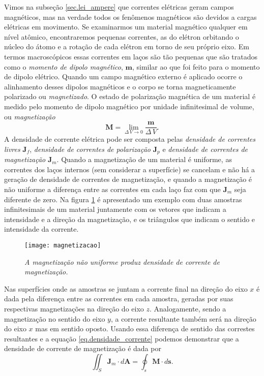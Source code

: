Vimos na subseç\~ao \ref{sec.lei_ampere} que correntes el\'etricas geram campos magn\'eticos, mas na verdade todos os fen\^omenos magn\'eticos são devidos a cargas el\'etricas em movimento. Se examinarmos um material magn\'etico qualquer em n\'ivel at\^omico, encontraremos pequenas correntes, as do el\'etron orbitando o n\'ucleo do \'atomo e a rota\c{c}\~ao de cada el\'etron em torno de seu pr\'oprio eixo. Em termos macrosc\'opicos essas correntes em la\c{c}os s\~ao t\~ao pequenas que s\~ao tratados como o \textit{momento de dipolo magn\'etico}, $\mathbf{m}$, similar ao que foi feito para o momento de dipolo el\'etrico. Quando um campo magn\'etico externo \'e aplicado ocorre o alinhamento desses dipolos magn\'eticos e o corpo se torna magneticamente polarizado ou \textit{magnetizado}. O estado de polariza\c{c}\~ao magn\'etica de um material \'e medido pelo momento de dipolo magn\'etico por unidade infinitesimal de volume, ou \textit{magnetiza\c{c}\~ao}
\begin{equation*}
\mathbf{M}=\lim_{\Delta\,V\to 0}\frac{\mathbf{m}}{\Delta\,V}.
\end{equation*}   
A densidade de corrente el\'etrica pode ser composta pelas \textit{densidade de correntes livres} $\mathbf{J}_f$, \textit{densidade de correntes de polariza\c{c}\~ao} $\mathbf{J}_p$ e \textit{densidade de correntes de magnetiza\c{c}\~ao} $\mathbf{J}_m$. Quando a magnetiza\c{c}\~ao de um material \'e uniforme, as correntes dos la\c{c}os internos (sem considerar a superf\'icie) se cancelam e n\~ao h\'a a gera\c{c}\~ao de densidade de correntes de magnetiza\c{c}\~ao, e quando a magnetiza\c{c}\~ao \'e n\~ao uniforme a diferen\c{c}a entre as correntes em cada la\c{c}o faz com que $\mathbf{J}_m$ seja diferente de zero. Na figura \ref{fig.magnetizacao} \'e apresentado um exemplo com duas amostras infinitesimais de um material juntamente com os vetores que indicam a intensidade e a dire\c{c}\~ao da magnetiza\c{c}\~ao, e os tri\^angulos que indicam o sentido e intensidade da corrente.
\begin{figure}
\centering
\texttt{[image: magnetizacao]}
\caption{\textit{A magnetiza\c{c}\~ao n\~ao uniforme produz densidade de corrente de magnetiza\c{c}\~ao.}}
\label{fig.magnetizacao}
\end{figure}     
Nas superf\'icies onde as amostras se juntam a corrente final na dire\c{c}\~ao do eixo $x$ \'e dada pela diferen\c{c}a entre as correntes em cada amostra, geradas por suas respectivas magnetiza\c{c}\~oes na dire\c{c}\~ao do eixo $z$. Analogamente, sendo a magnetiza\c{c}\~ao no sentido do eixo $y$, a corrente resultante tamb\'em ser\'a na dire\c{c}\~ao do eixo $x$ mas em sentido oposto. Usando essa diferen\c{c}a de sentido das correstes resultantes e a equa\c{c}\~ao \ref{eq.densidade_corrente} podemos demonstrar que a densidade de corrente de magnetiza\c{c}\~ao \'e dada por
\begin{equation}\label{eq.magnetizacao_densi_corrente}
\iint_S\mathbf{J}_m\cdot d\mathbf{A}=\oint_s \mathbf{M}\cdot d\mathbf{s}.
\end{equation}


